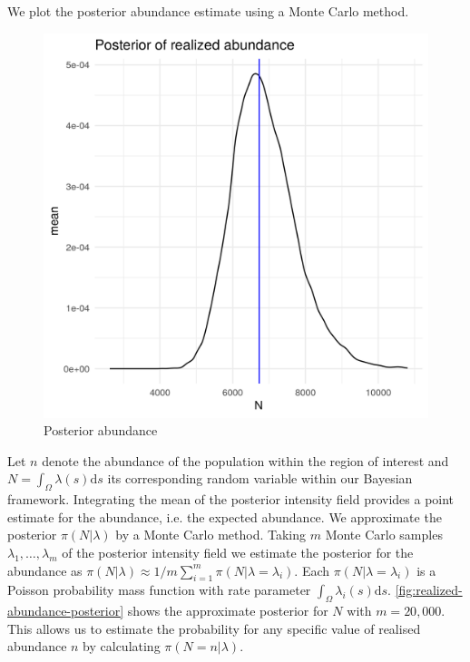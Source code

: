 \documentclass[preprint,12pt]{elsarticle}
\begin{document}
We plot the posterior abundance estimate using a Monte Carlo method.
\begin{figure}[h]
	\begin{center}
		\includegraphics[scale=0.525]{figures/realized_abundance_posterior.png}
		\caption{Posterior abundance}
		\label{fig:realized-abundance-posterior}
	\end{center}
\end{figure}
Let $n$ denote the abundance of the population within the region of interest and $N = \int_{\Omega}\lambda(s)\mathrm{d}s$ its corresponding random variable within our Bayesian framework.  Integrating the mean of the posterior intensity field provides a point estimate for the abundance, i.e. the expected abundance.  We approximate the posterior $\pi(N | \lambda)$ by a Monte Carlo method.  Taking $m$ Monte Carlo samples  $\lambda_1, \ldots, \lambda_m$ of the posterior intensity field we estimate the posterior for the abundance as $\pi(N | \lambda) \approx 1 / m \sum_{i=1}^m \pi (N | \lambda = \lambda_i)$. Each $\pi(N | \lambda = \lambda_i)$ is a Poisson probability mass function with rate parameter $\int_{\Omega}\lambda_i(s)\mathrm{d}s$. \autoref{fig:realized-abundance-posterior} shows the approximate posterior for $N$ with $m = 20,000$.  This allows us to estimate the probability for any specific value of realised abundance $n$ by calculating $\pi(N = n | \lambda)$.
  
\end{document}
